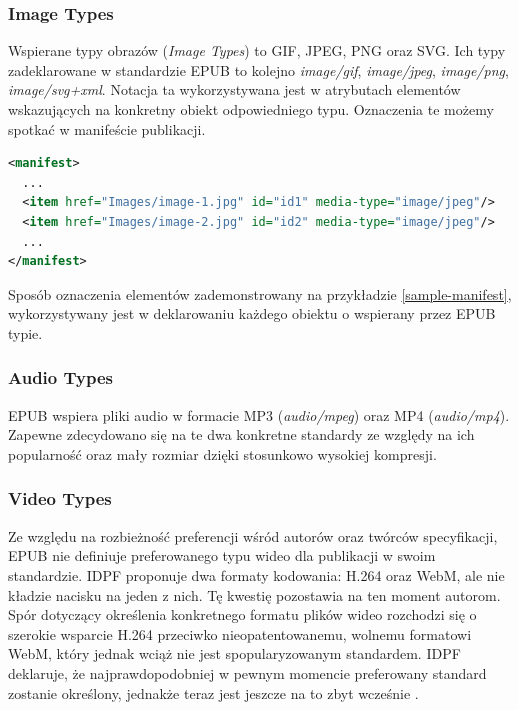 \subsubsection*{Image Types}

Wspierane typy obrazów (\textit{Image Types}) to GIF, JPEG, PNG oraz SVG. Ich typy zadeklarowane w standardzie EPUB to kolejno \textit{image/gif}, \textit{image/jpeg}, \textit{image/png}, \textit{image/svg+xml}. Notacja ta wykorzystywana jest w atrybutach elementów wskazujących na konkretny obiekt odpowiedniego typu. Oznaczenia te możemy spotkać w manifeście publikacji.

\begin{lstlisting}[caption={Przykładowy fragment manifestu znajdującego się w pliku content.opf}, language=XML,label=sample-manifest]
<manifest>
  ...
  <item href="Images/image-1.jpg" id="id1" media-type="image/jpeg"/>
  <item href="Images/image-2.jpg" id="id2" media-type="image/jpeg"/>
  ...
</manifest>
\end{lstlisting}

Sposób oznaczenia elementów zademonstrowany na przykładzie \ref{sample-manifest}, wykorzystywany jest w deklarowaniu każdego obiektu o wspierany przez EPUB typie.

\subsubsection*{Audio Types}

EPUB wspiera pliki audio w formacie MP3 (\textit{audio/mpeg}) oraz MP4 (\textit{audio/mp4}). Zapewne zdecydowano się na te dwa konkretne standardy ze względy na ich popularność oraz mały rozmiar dzięki stosunkowo wysokiej kompresji.

\subsubsection*{Video Types}

Ze względu na rozbieżność preferencji wśród autorów oraz twórców specyfikacji, EPUB nie definiuje preferowanego typu wideo dla publikacji w swoim standardzie. IDPF proponuje dwa formaty kodowania: H.264 oraz WebM, ale nie kładzie nacisku na jeden z nich. Tę kwestię pozostawia na ten moment autorom. Spór dotyczący określenia konkretnego formatu plików wideo rozchodzi się o szerokie wsparcie H.264 przeciwko nieopatentowanemu, wolnemu formatowi WebM, który jednak wciąż nie jest spopularyzowanym standardem. IDPF deklaruje, że najprawdopodobniej w pewnym momencie preferowany standard zostanie określony, jednakże teraz jest jeszcze na to zbyt wcześnie \cite{WhatIsEPUB3Video}.

